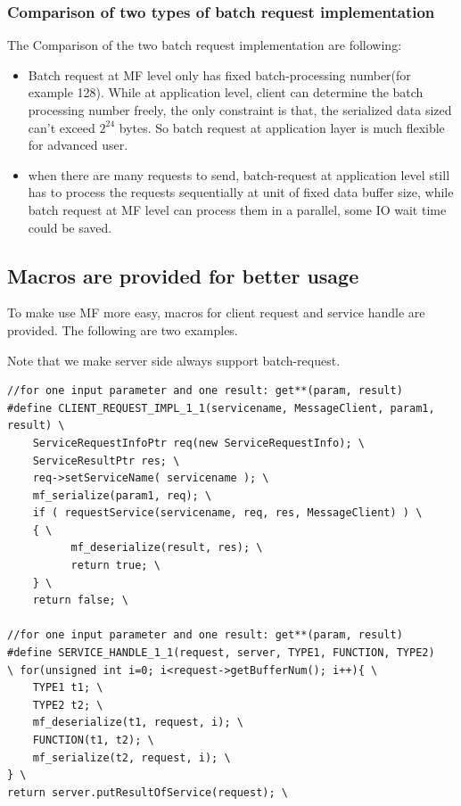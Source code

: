 \documentclass[a4paper,10pt]{article}
\begin{document}
\subsubsection{Comparison of two types of batch request implementation}
The Comparison of the two batch request implementation are following:
\begin{itemize}
 \item Batch request at MF level only has fixed batch-processing number(for example 128).  While at application level,
client can determine the batch processing number freely, the only constraint is that,
the serialized data sized can't exceed $2^24$ bytes. So batch request at application layer is much flexible for advanced user.
 \item when there are many requests to send, batch-request at application level still has to
process the requests sequentially at unit of fixed data buffer size, while batch request at MF level can process them in a parallel,
some IO wait time could be saved.
\end{itemize}


\subsection{Macros are provided for better usage}

To make use MF more easy, macros for client request and service
handle are provided. The following are two examples.

Note that we make server side always support batch-request.
\begin{lstlisting}
//for one input parameter and one result: get**(param, result)
#define CLIENT_REQUEST_IMPL_1_1(servicename, MessageClient, param1, result) \
    ServiceRequestInfoPtr req(new ServiceRequestInfo); \
    ServiceResultPtr res; \
    req->setServiceName( servicename ); \
    mf_serialize(param1, req); \
    if ( requestService(servicename, req, res, MessageClient) ) \
    { \
          mf_deserialize(result, res); \
          return true; \
    } \
    return false; \

//for one input parameter and one result: get**(param, result)
#define SERVICE_HANDLE_1_1(request, server, TYPE1, FUNCTION, TYPE2)
\ for(unsigned int i=0; i<request->getBufferNum(); i++){ \
    TYPE1 t1; \
    TYPE2 t2; \
    mf_deserialize(t1, request, i); \
    FUNCTION(t1, t2); \
    mf_serialize(t2, request, i); \
} \
return server.putResultOfService(request); \


\end{lstlisting}
\end{document}
